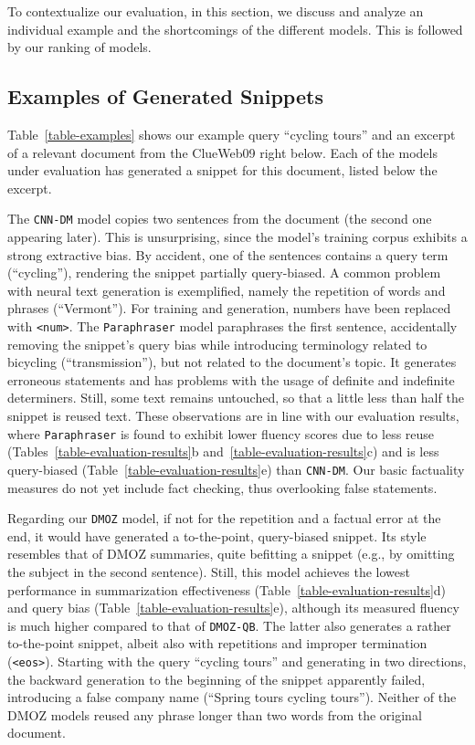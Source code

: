\documentclass[sigconf]{acmart}
\begin{document}
To contextualize our evaluation, in this section, we discuss and analyze an individual example and the shortcomings of the different models. This is followed by our ranking of models.

\subsection{Examples of Generated Snippets}

Table~\ref{table-examples} shows our example query ``cycling tours'' and an excerpt of a relevant document from the ClueWeb09 right below. Each of the models under evaluation has generated a snippet for this document, listed below the excerpt.

The {\small\tt CNN-DM} model copies two sentences from the document (the second one appearing later). This is unsurprising, since the model's training corpus exhibits a strong extractive bias. By accident, one of the sentences contains a query term (``cycling''), rendering the snippet partially query-biased. A common problem with neural text generation is exemplified, namely the repetition of words and phrases (``Vermont''). For training and generation, numbers have been replaced with {\small\tt <num>}. The {\small\tt Paraphraser} model paraphrases the first sentence, accidentally removing the snippet's query bias while introducing terminology related to bicycling (``transmission''), but not related to the document's topic. It generates erroneous statements and has problems with the usage of definite and indefinite determiners. Still, some text remains untouched, so that a little less than half the snippet is reused text. These observations are in line with our evaluation results, where {\small\tt Paraphraser} is found to exhibit lower fluency scores due to less reuse (Tables~\ref{table-evaluation-results}b and~\ref{table-evaluation-results}c) and is less query-biased (Table~\ref{table-evaluation-results}e) than {\small\tt CNN-DM}. Our basic factuality measures do not yet include fact checking, thus overlooking false statements.

Regarding our {\small\tt DMOZ} model, if not for the repetition and a factual error at the end, it would have generated a to-the-point, query-biased snippet. Its style resembles that of DMOZ summaries, quite befitting a snippet (e.g., by omitting the subject in the second sentence). Still, this model achieves the lowest performance in summarization effectiveness (Table~\ref{table-evaluation-results}d) and query bias (Table~\ref{table-evaluation-results}e), although its measured fluency is much higher compared to that of {\small\tt DMOZ-QB}. The latter also generates a rather to-the-point snippet, albeit also with repetitions and improper termination ({\small\tt <eos>}). Starting with the query ``cycling tours'' and generating in two directions, the backward generation to the beginning of the snippet apparently failed, introducing a false company name (``Spring tours cycling tours''). Neither of the DMOZ models reused any phrase longer than two words from the original document.
\end{document}
